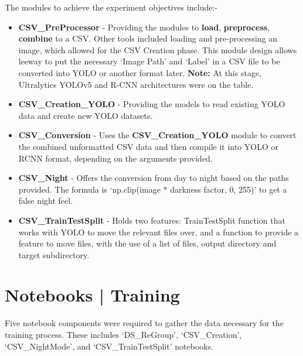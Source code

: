 \documentclass[12pt]{report} %
\begin{document}
		The modules to achieve the experiment objectives include:-
		\begin{itemize}
            \item \textbf{CSV\_PreProcessor} - Providing the modules to \textbf{load}, \textbf{preprocess}, \textbf{combine} to a CSV. Other tools included loading and pre-processing an image, which allowed for the CSV Creation phase. This module design allows leeway to put the necessary `Image Path' and `Label' in a CSV file to be converted into YOLO or another format later. \textbf{Note:} At this stage, Ultralytics YOLOv5 and R-CNN architectures were on the table.
            \item \textbf{CSV\_Creation\_YOLO} - Providing the models to read existing YOLO data and create new YOLO datasets.
            \item \textbf{CSV\_Conversion} - Uses the \textbf{CSV\_Creation\_YOLO} module to convert the combined unformatted CSV data and then compile it into YOLO or RCNN format, depending on the arguments provided.
            \item \textbf{CSV\_Night} - Offers the conversion from day to night based on the paths provided. The formula is `np.clip(image * darkness factor, 0, 255)' to get a false night feel.
			\item \textbf{CSV\_TrainTestSplit} - Holds two features: TrainTestSplit function that works with YOLO to move the relevant files over, and a function to provide a feature to move files, with the use of a list of files, output directory and target subdirectory.
        \end{itemize}

	\section{Notebooks | Training}
		Five notebook components were required to gather the data necessary for the training process. These includes `DS\_ReGroup', `CSV\_Creation', `CSV\_NightMode', and `CSV\_TrainTestSplit' notebooks.
\end{document}
